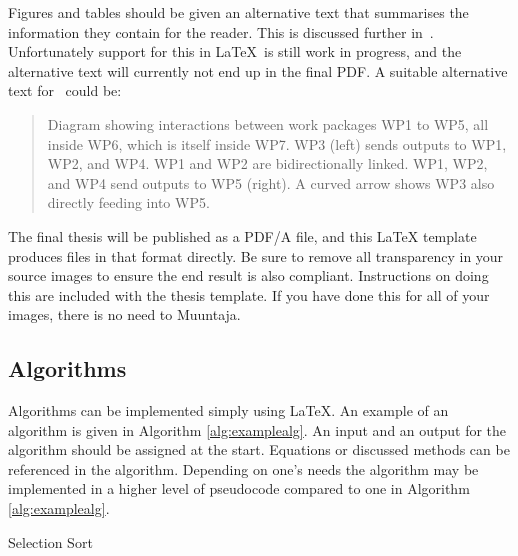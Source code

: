 Figures and tables should be given an alternative text that summarises
the information they contain for the reader. This is discussed further
in~. Unfortunately support for this in
\LaTeX\ is still work in progress, and the alternative text will
currently not end up in the final PDF. A suitable alternative text
for~ could be:

\begin{quote}
Diagram showing interactions between work packages WP1 to WP5, all
inside WP6, which is itself inside WP7. WP3 (left) sends outputs to
WP1, WP2, and WP4. WP1 and WP2 are bidirectionally linked. WP1,
WP2, and WP4 send outputs to WP5 (right). A curved arrow shows WP3
also directly feeding into WP5.
\end{quote}

The final thesis will be published as a PDF/A file, and this LaTeX
template produces files in that format directly. Be sure to remove all 
transparency in your source images to ensure the end result is also 
compliant. Instructions on doing this are included with the thesis template.
If you have done this for all of your images, there is no need to
Muuntaja.

\subsection{Algorithms}
Algorithms can be implemented simply using \LaTeX. An example of an
algorithm is given in Algorithm \ref{alg:examplealg}. An input and an
output for the algorithm should be assigned at the start. Equations
or discussed methods can be referenced in the algorithm. Depending on
one's needs the algorithm may be implemented in a higher level of
pseudocode compared to one in Algorithm \ref{alg:examplealg}.

\vspace{7mm}
\begin{algorithm}[H]
\SetAlgoLined
\DontPrintSemicolon
{}
\caption{Selection Sort}
\label{alg:examplealg}
\end{algorithm}


